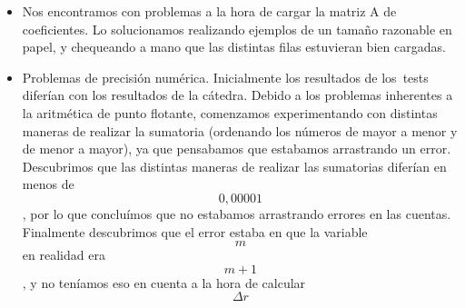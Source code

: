 \begin{itemize}
\item Nos encontramos con problemas a la hora de cargar la matriz A de coeficientes. Lo solucionamos realizando ejemplos de un tamaño razonable en papel, y chequeando a mano que las distintas filas estuvieran bien cargadas.

\item Problemas de precisión numérica. Inicialmente los resultados de los\ tests diferían con los resultados de la cátedra. Debido a los problemas inherentes a la aritmética de punto flotante, comenzamos experimentando con distintas maneras de realizar la sumatoria (ordenando los números de mayor a menor y de menor a mayor), ya que pensabamos que estabamos arrastrando un error. Descubrimos que las distintas maneras de realizar las sumatorias diferían en menos de $$0,00001$$, por lo que concluímos que no estabamos arrastrando errores en las cuentas. Finalmente descubrimos que el error estaba en que la variable $$m$$ en realidad era $$m+1$$, y no teníamos eso en cuenta a la hora de calcular $$\Delta r$$

\end{itemize}